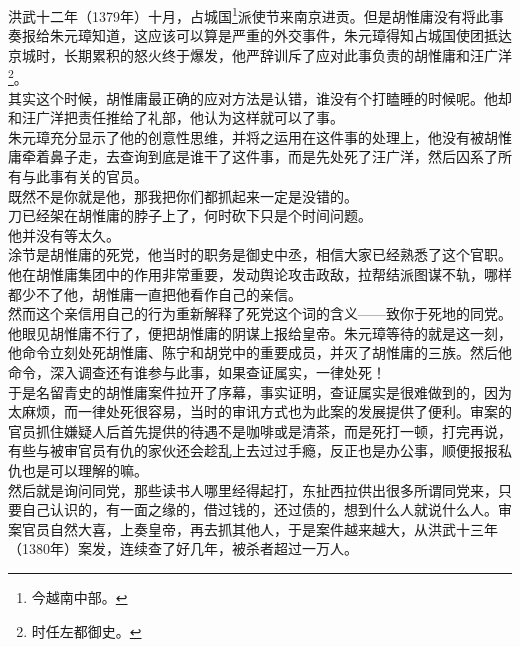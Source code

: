 \begin{multicols}{\theparacolNo}
洪武十二年（1379年）十月，占城国\footnote{今越南中部。}派使节来南京进贡。但是胡惟庸没有将此事奏报给朱元璋知道，这应该可以算是严重的外交事件，朱元璋得知占城国使团抵达京城时，长期累积的怒火终于爆发，他严辞训斥了应对此事负责的胡惟庸和汪广洋\footnote{时任左都御史。}。\\

其实这个时候，胡惟庸最正确的应对方法是认错，谁没有个打瞌睡的时候呢。他却和汪广洋把责任推给了礼部，他认为这样就可以了事。\\

朱元璋充分显示了他的创意性思维，并将之运用在这件事的处理上，他没有被胡惟庸牵着鼻子走，去查询到底是谁干了这件事，而是先处死了汪广洋，然后囚系了所有与此事有关的官员。\\

既然不是你就是他，那我把你们都抓起来一定是没错的。\\

刀已经架在胡惟庸的脖子上了，何时砍下只是个时间问题。\\

他并没有等太久。\\

涂节是胡惟庸的死党，他当时的职务是御史中丞，相信大家已经熟悉了这个官职。他在胡惟庸集团中的作用非常重要，发动舆论攻击政敌，拉帮结派图谋不轨，哪样都少不了他，胡惟庸一直把他看作自己的亲信。\\

然而这个亲信用自己的行为重新解释了死党这个词的含义——致你于死地的同党。\\

他眼见胡惟庸不行了，便把胡惟庸的阴谋上报给皇帝。朱元璋等待的就是这一刻，他命令立刻处死胡惟庸、陈宁和胡党中的重要成员，并灭了胡惟庸的三族。然后他命令，深入调查还有谁参与此事，如果查证属实，一律处死！\\

于是名留青史的胡惟庸案件拉开了序幕，事实证明，查证属实是很难做到的，因为太麻烦，而一律处死很容易，当时的审讯方式也为此案的发展提供了便利。审案的官员抓住嫌疑人后首先提供的待遇不是咖啡或是清茶，而是死打一顿，打完再说，有些与被审官员有仇的家伙还会趁乱上去过过手瘾，反正也是办公事，顺便报报私仇也是可以理解的嘛。\\

然后就是询问同党，那些读书人哪里经得起打，东扯西拉供出很多所谓同党来，只要自己认识的，有一面之缘的，借过钱的，还过债的，想到什么人就说什么人。审案官员自然大喜，上奏皇帝，再去抓其他人，于是案件越来越大，从洪武十三年（1380年）案发，连续查了好几年，被杀者超过一万人。\\


\end{multicols}
